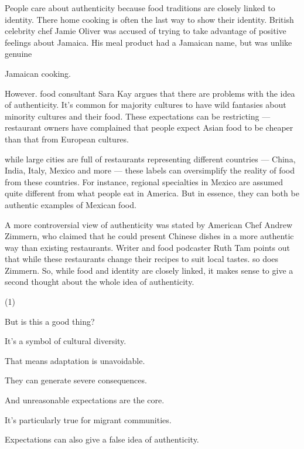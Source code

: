 \documentclass{英语试卷}
\begin{document}
\par People care about authenticity because food traditions are closely linked to identity.  There home cooking is often the last way to show their identity. British celebrity chef Jamie Oliver was accused of trying to take advantage of positive feelings about Jamaica. His meal product had a Jamaican name, but was unlike genuine\par
\par Jamaican cooking.\par
\par However. food consultant Sara Kay argues that there are problems with the idea of authenticity.  It's common for majority cultures to have wild fantasies about minority cultures and their food. These expectations can be restricting — restaurant owners have complained that people expect Asian food to be cheaper than that from European cultures.\par
\par {} while large cities are full of restaurants representing different countries — China, India, Italy, Mexico and more — these labels can oversimplify the reality of food from these countries. For instance, regional specialties in Mexico are assumed quite different from what people eat in America. But in essence, they can both be authentic examples of Mexican food.\par
\par A more controversial view of authenticity was stated by American Chef Andrew Zimmern, who claimed that he could present Chinese dishes in a more authentic way than existing restaurants. Writer and food podcaster Ruth Tam points out that while these restaurants change their recipes to suit local tastes. so does Zimmern.  So, while food and identity are closely linked, it makes sense to give a second thought about the whole idea of authenticity.\par
\begin{choices}(1)
  \item But is this a good thing?
  \item It's a symbol of cultural diversity.
  \item That means adaptation is unavoidable.
  \item They can generate severe consequences.
  \item And unreasonable expectations are the core.
  \item It's particularly true for migrant communities.
  \item Expectations can also give a false idea of authenticity.
\end{choices}
\end{document}

